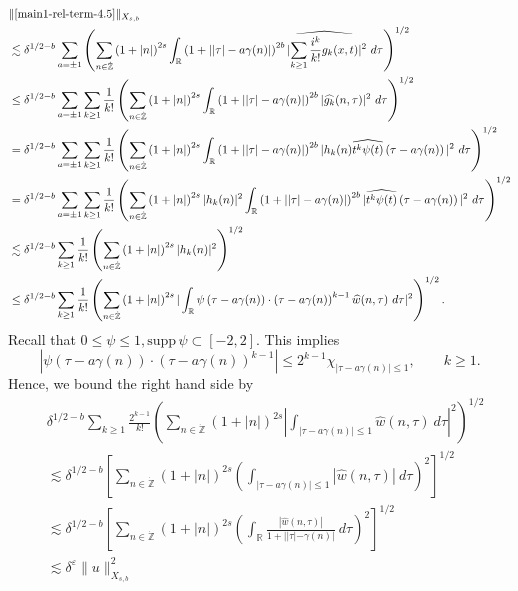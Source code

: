 \documentclass[12pt,reqno]{amsart}
\numberwithin{equation}{section}  %
\renewcommand{\cref}{\Cref}
\newcommand{\rr}{\mathbb{R}}
\newcommand{\zz}{\mathbb{Z}}
\newcommand{\zzdot}{\dot{\zz}}
\newcommand{\wh}{\widehat}
\newcommand{\ee}{\varepsilon}
\begin{document}
\begin{equation}
\label{2n}
\begin{split}
& \|\cref{main1-rel-term-4.5}\|_{X_{s,b}} 
\\
& \lesssim \delta^{1/2 - b} \sum_{a = \pm 1} \left( \sum_{n \in \zzdot} \left (1 + |n| \right )^{2s}
\int_\rr \left( 1 + | |\tau| - a\gamma(n) | \right)^{2b}
| \wh{\sum_{k \ge 1} \frac{i^k}{k!}g_k(x,t)} |^2 \ d \tau
\right)^{1/2}
\\
& \le \delta^{1/2 - b}\sum_{a = \pm 1}\sum_{k \ge 1} \frac{1}{k!}\left( \sum_{n \in \zzdot} \left (1 + |n| \right )^{2s}
\int_\rr \left( 1 + | |\tau| - a\gamma(n) | \right)^{2b} | \wh{g_k}(n, \tau) |^2 \
d \tau \right)^{1/2}
\\
& = \delta^{1/2 - b}\sum_{a = \pm 1}\sum_{k \ge 1} \frac{1}{k!} \left( \sum_{n \in \zzdot} \left (1 + |n| \right )^{2s}
\int_\rr \left( 1 + | |\tau| - a\gamma(n) | \right)^{2b} | h_k(n) \wh{t^k
\psi(t)} \left( \tau - a\gamma(n) \right) |^2 \ d \tau \right)^{1/2}
\\
& = \delta^{1/2 - b} \sum_{a = \pm 1}\sum_{k \ge 1} \frac{1}{k!} \left( \sum_{n \in \zzdot} \left (1 + |n| \right )^{2s} |
h_k(n) |^2 \int_\rr \left( 1 + | |\tau| - a\gamma(n) | \right)^{2b} | \wh{t^k
\psi(t)} \left( \tau - a\gamma(n) \right) |^2 \ d \tau \right)^{1/2}
\\
& \lesssim \delta^{1/2 - b}
\sum_{k \ge 1} \frac{1}{k!} \left( \sum_{n \in \zzdot} \left (1 + |n| \right )^{2s} | h_k(n) |^2 
\right)^{1/2}
\\
& \le \delta^{1/2 - b}\sum_{k \ge 1} \frac{1}{k!}
\left( \sum_{n \in \zzdot} \left (1 + |n| \right )^{2s} |\int_\rr 
\psi\left( \tau - a\gamma(n) \right) \cdot \left( \tau - a\gamma(n) 
\right)^{k -1} \wh{w}(n, \tau) \ d \tau|^{2} \right)^{1/2}.
\end{split}
\end{equation}
Recall that $0 \le \psi \le 1, \text{supp} \, \psi \subset [-2,2 ]$. 
This implies $$| \psi\left( \tau - a\gamma(n) \right) \cdot \left( \tau - a\gamma(n)
\right)^{k -1} | \le 2^{k-1} \chi_{| \tau - a\gamma(n) | \le 1}, \qquad k \ge 1.$$ Hence,
we bound the right hand side by
\begin{equation*}
\begin{split}
& \delta^{1/2 - b}\sum_{k \ge 1} \frac{2^{k-1}}{k!}
\left( \sum_{n \in \zzdot} (1 + | n |)^{2s}| 
\int_{| \tau - a\gamma(n)  |\le 1}  \wh{w}(n, \tau) \ d \tau |^2 
\right)^{1/2}
\\
& \lesssim \delta^{1/2 - b}
\left[ \sum_{n \in \zzdot} (1 + | n |)^{2s}\left (  
\int_{| \tau - a\gamma(n)  |\le 1} | \wh{w}(n, \tau) | \ d \tau \right ) ^2 
\right]^{1/2}
\\
& \lesssim \delta^{1/2 - b}\left[ \sum_{n \in \zzdot} (1 + | n |)^{2s}\left( \int_\rr
\frac{|\wh{w}(n, \tau)|}{1 + | |\tau| - \gamma(n) |} \ d \tau \right ) ^2 
\right]^{1/2}
\\
& \lesssim \delta^{\ee} \| u \|_{X_{s,b}}^{2}
\end{split}
\end{equation*}
\end{document}
